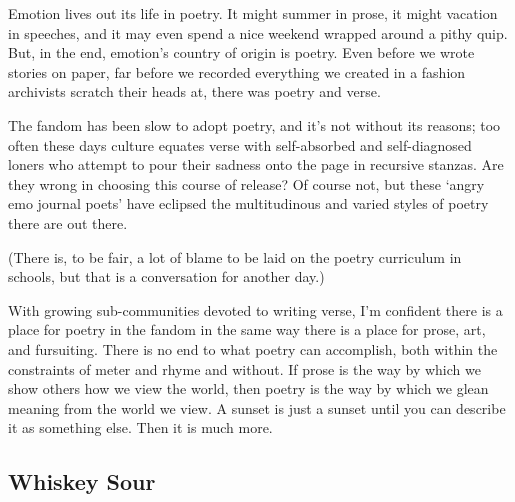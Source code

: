
Emotion lives out its life in poetry. It might summer in prose, it might vacation in speeches, and it may even spend a nice weekend wrapped around a pithy quip. But, in the end, emotion's country of origin is poetry. Even before we wrote stories on paper, far before we recorded everything we created in a fashion archivists scratch their heads at, there was poetry and verse.

The fandom has been slow to adopt poetry, and it's not without its reasons; too often these days culture equates verse with self-absorbed and self-diagnosed loners who attempt to pour their sadness onto the page in recursive stanzas. Are they wrong in choosing this course of release? Of course not, but these ‘angry emo journal poets' have eclipsed the multitudinous and varied styles of poetry there are out there.

(There is, to be fair, a lot of blame to be laid on the poetry curriculum in schools, but that is a conversation for another day.)

With growing sub-communities devoted to writing verse, I'm confident there is a place for poetry in the fandom in the same way there is a place for prose, art, and fursuiting. There is no end to what poetry can accomplish, both within the constraints of meter and rhyme and without. If prose is the way by which we show others how we view the world, then poetry is the way by which we glean meaning from the world we view. A sunset is just a sunset until you can describe it as something else. Then it is much more.

\subsection*{Whiskey Sour}

